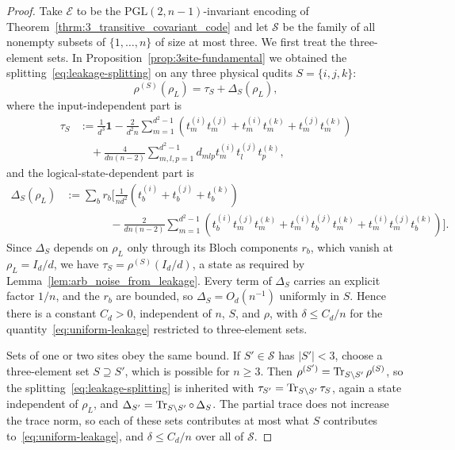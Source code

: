 \documentclass[10pt,twocolumn,superscriptaddress,aps,amsmath,amssymb,citeautoscript,floatfix,prx]{revtex4-2}
\theoremstyle{plain}
\theoremstyle{plain}
\theoremstyle{plain}
\theoremstyle{plain}
\theoremstyle{plain}
\theoremstyle{plain}
\theoremstyle{plain}
\theoremstyle{definition}
\theoremstyle{plain}
\begin{document}
\begin{appendix}
\begin{proof}
    Take $\mathcal E$ to be the $\mathrm{PGL}(2,n-1)$-invariant encoding of Theorem~\ref{thrm:3_transitive_covariant_code} and let $\mathcal S$ 
    be the family of all nonempty subsets of $\{1,\ldots,n\}$ of size at most three. We first treat the three-element sets. 
    In Proposition~\ref{prop:3site-fundamental} we obtained the splitting~\eqref{eq:leakage-splitting} on any three physical qudits \(S=\{i,j,k\}\):
    \[
        \rho^{(S)}(\rho_L)
        =
        \tau_S+\Delta_S(\rho_L),
    \]
    where the input-independent part is
    \[
    \begin{aligned}
        \tau_S
        &:=
        \frac{1}{d^3}\mathbf 1
        -\frac{2}{d^2 n}
        \sum_{m=1}^{d^2-1}
        \left(
            t_m^{(i)}t_m^{(j)}
            +
            t_m^{(i)}t_m^{(k)}
            +
            t_m^{(j)}t_m^{(k)}
        \right)
        \\
        &\quad
        +
        \frac{4}{d n(n-2)}
        \sum_{m,l,p=1}^{d^2-1}
        d_{mlp}
        t_m^{(i)}t_l^{(j)}t_p^{(k)},
    \end{aligned}
    \]
    and the logical-state-dependent part is
    \[
    \begin{aligned}
        \Delta_S(\rho_L)
        &:=
        \sum_b r_b
        \Bigg[
        \frac{1}{n d^2}
        \left(
            t_b^{(i)}+t_b^{(j)}+t_b^{(k)}
        \right)
        \\
        &\qquad\qquad
        -
        \frac{2}{d n(n-2)}
        \sum_{m=1}^{d^2-1}
        \left(
            t_b^{(i)}t_m^{(j)}t_m^{(k)}
            +
            t_m^{(i)}t_b^{(j)}t_m^{(k)}
            +
            t_m^{(i)}t_m^{(j)}t_b^{(k)}
        \right)
        \Bigg].
    \end{aligned}
    \]
    Since $\Delta_S$ depends on $\rho_L$ only through its Bloch components $r_b$, which vanish at $\rho_L=I_d/d$, we have $\tau_S=\rho^{(S)}(I_d/d)$, a state as required by Lemma~\ref{lem:arb_noise_from_leakage}. 
    Every term of $\Delta_S$ carries an explicit factor $1/n$, and the $r_b$ are bounded, so \(\Delta_S=O_{d}(n^{-1})\) uniformly in \(S\). 
    Hence there is a constant \(C_d>0\), independent of \(n\), \(S\), and \(\rho\), with $\delta\le C_d/n$ for the quantity~\eqref{eq:uniform-leakage} restricted to three-element sets.

    Sets of one or two sites obey the same bound.  If $S'\in\mathcal S$ has $|S'|<3$, choose a three-element set $S\supseteq S'$, which is possible for $n\ge3$. 
    Then $\rho^{(S')}=\Tr_{S\setminus S'}\rho^{(S)}$, so the splitting~\eqref{eq:leakage-splitting} is inherited with $\tau_{S'}=\Tr_{S\setminus S'}\tau_S$, again a state independent of $\rho_L$, and $\Delta_{S'}=\Tr_{S\setminus S'}\circ\,\Delta_S$.
    The partial trace does not increase the trace norm, so each of these sets contributes at most what $S$ contributes to~\eqref{eq:uniform-leakage}, and $\delta\le C_d/n$ over all of $\mathcal S$.


\end{proof}
\end{appendix}
\end{document}

